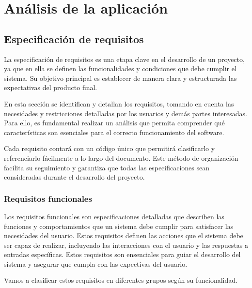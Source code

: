 \chapter{Análisis de la aplicación}
\label{cap:analisis_aplicacion} 

\section{Especificación de requisitos}
\label{sec:requisitos}
La especificación de requisitos es una etapa clave en el desarrollo de un proyecto, ya que en ella se definen las funcionalidades y condiciones que debe cumplir el sistema. Su objetivo principal
es establecer de manera clara y estructurada las expectativas del producto final.

En esta sección se identifican y detallan los requisitos, tomando en cuenta las necesidades y restricciones detalladas por los 
usuarios y demás partes interesadas. Para ello, es fundamental realizar un análisis que permita comprender qué características son esenciales 
para el correcto funcionamiento del software.

Cada requisito contará con un código único que permitirá clasificarlo y referenciarlo fácilmente a lo largo del documento. Este método de organización facilita su seguimiento y garantiza que 
todas las especificaciones sean consideradas durante el desarrollo del proyecto. 

\subsection{Requisitos funcionales}
\label{subsec:requisitos_funcionales}
Los requisitos funcionales son especificaciones detalladas que describen las funciones y comportamientos que un sistema debe cumplir para 
satisfacer las necesidades del usuario. Estos requisitos definen las acciones que el sistema debe ser capaz de realizar, incluyendo las interacciones
con el usuario y las respuestas a entradas específicas. Estos requisitos son ensenciales para guiar el desarrollo del sistema y asegurar que cumpla con las expectivas del usuario. \cite{pmo2017}

Vamos a clasificar estos requisitos en diferentes grupos según su funcionalidad. 

